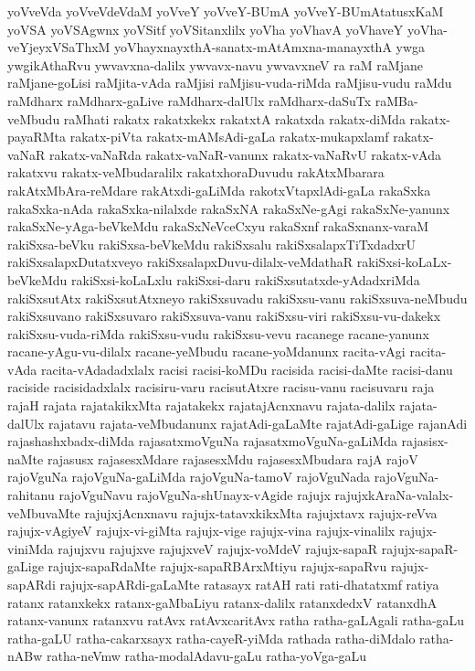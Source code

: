 {yoVveVda
yoVveVdeVdaM
yoVveY
yoVveY-BUmA
yoVveY-BUmAtatusxKaM
yoVSA
yoVSAgwnx
yoVSitf
yoVSitanxlilx
yoVha
yoVhavA
yoVhaveY
yoVha-veYjeyxVSaThxM
yoVhayxnayxthA-sanatx-mAtAmxna-manayxthA
ywga
ywgikAthaRvu
ywvavxna-dalilx
ywvavx-navu
ywvavxneV
ra
raM
raMjane
raMjane-goLisi
raMjita-vAda
raMjisi
raMjisu-vuda-riMda
raMjisu-vudu
raMdu
raMdharx
raMdharx-gaLive
raMdharx-dalUlx
raMdharx-daSuTx
raMBa-veMbudu
raMhati
rakatx
rakatxkekx
rakatxtA
rakatxda
rakatx-diMda
rakatx-payaRMta
rakatx-piVta
rakatx-mAMsAdi-gaLa
rakatx-mukapxlamf
rakatx-vaNaR
rakatx-vaNaRda
rakatx-vaNaR-vanunx
rakatx-vaNaRvU
rakatx-vAda
rakatxvu
rakatx-veMbudaralilx
rakatxhoraDuvudu
rakAtxMbarara
rakAtxMbAra-reMdare
rakAtxdi-gaLiMda
rakotxVtapxlAdi-gaLa
rakaSxka
rakaSxka-nAda
rakaSxka-nilalxde
rakaSxNA
rakaSxNe-gAgi
rakaSxNe-yanunx
rakaSxNe-yAga-beVkeMdu
rakaSxNeVceCxyu
rakaSxnf
rakaSxnanx-varaM
rakiSxsa-beVku
rakiSxsa-beVkeMdu
rakiSxsalu
rakiSxsalapxTiTxdadxrU
rakiSxsalapxDutatxveyo
rakiSxsalapxDuvu-dilalx-veMdathaR
rakiSxsi-koLaLx-beVkeMdu
rakiSxsi-koLaLxlu
rakiSxsi-daru
rakiSxsutatxde-yAdadxriMda
rakiSxsutAtx
rakiSxsutAtxneyo
rakiSxsuvadu
rakiSxsu-vanu
rakiSxsuva-neMbudu
rakiSxsuvano
rakiSxsuvaro
rakiSxsuva-vanu
rakiSxsu-viri
rakiSxsu-vu-dakekx
rakiSxsu-vuda-riMda
rakiSxsu-vudu
rakiSxsu-vevu
racanege
racane-yanunx
racane-yAgu-vu-dilalx
racane-yeMbudu
racane-yoMdanunx
racita-vAgi
racita-vAda
racita-vAdadadxlalx
racisi
racisi-koMDu
racisida
racisi-daMte
racisi-danu
raciside
racisidadxlalx
racisiru-varu
racisutAtxre
racisu-vanu
racisuvaru
raja
rajaH
rajata
rajatakikxMta
rajatakekx
rajatajAcnxnavu
rajata-dalilx
rajata-dalUlx
rajatavu
rajata-veMbudanunx
rajatAdi-gaLaMte
rajatAdi-gaLige
rajanAdi
rajashashxbadx-diMda
rajasatxmoVguNa
rajasatxmoVguNa-gaLiMda
rajasisx-naMte
rajasusx
rajasesxMdare
rajasesxMdu
rajasesxMbudara
rajA
rajoV
rajoVguNa
rajoVguNa-gaLiMda
rajoVguNa-tamoV
rajoVguNada
rajoVguNa-rahitanu
rajoVguNavu
rajoVguNa-shUnayx-vAgide
rajujx
rajujxkAraNa-valalx-veMbuvaMte
rajujxjAcnxnavu
rajujx-tatavxkikxMta
rajujxtavx
rajujx-reVva
rajujx-vAgiyeV
rajujx-vi-giMta
rajujx-vige
rajujx-vina
rajujx-vinalilx
rajujx-viniMda
rajujxvu
rajujxve
rajujxveV
rajujx-voMdeV
rajujx-sapaR
rajujx-sapaR-gaLige
rajujx-sapaRdaMte
rajujx-sapaRBArxMtiyu
rajujx-sapaRvu
rajujx-sapARdi
rajujx-sapARdi-gaLaMte
ratasayx
ratAH
rati
rati-dhatatxmf
ratiya
ratanx
ratanxkekx
ratanx-gaMbaLiyu
ratanx-dalilx
ratanxdedxV
ratanxdhA
ratanx-vanunx
ratanxvu
ratAvx
ratAvxcaritAvx
ratha
ratha-gaLAgali
ratha-gaLu
ratha-gaLU
ratha-cakarxsayx
ratha-cayeR-yiMda
rathada
ratha-diMdalo
ratha-nABw
ratha-neVmw
ratha-modalAdavu-gaLu
ratha-yoVga-gaLu
}
